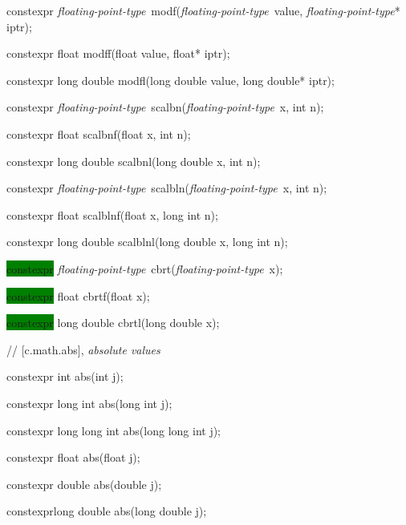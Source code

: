\documentclass[prd,twocolumn,amsmath,amssymb,nofootinbib,eqsecnum]{revtex4-1}
\newcommand{\highlight}[1]{\colorbox{green}{\!\!\!\! #1}}
\newcommand{\oldhighlight}[1]{#1}
\newcommand{\fptype}{{\it floating-point-type}}
\begin{document}
{\vspace{2ex}


\oldhighlight{constexpr} \fptype\ modf(\fptype\ value, \fptype* iptr);

\oldhighlight{constexpr}  float modff(float value, float* iptr);

\oldhighlight{constexpr}  long double modfl(long double value, long double* iptr);

\vspace{2ex}


\oldhighlight{constexpr} \fptype\ scalbn(\fptype\ x, int n);

\oldhighlight{constexpr} float scalbnf(float x, int n);

\oldhighlight{constexpr} long double scalbnl(long double x, int n);

\vspace{2ex}


\oldhighlight{constexpr} \fptype\ scalbln(\fptype\ x, int n);

\oldhighlight{constexpr} float scalblnf(float x, long int n);

\oldhighlight{constexpr} long double scalblnl(long double x, long int n);

\vspace{2ex}

\highlight{constexpr} \fptype\ cbrt(\fptype\ x);

\highlight{constexpr} float cbrtf(float x);

\highlight{constexpr} long double cbrtl(long double x);

\vspace{2ex}

//  [c.math.abs], {\it absolute values}


\oldhighlight{constexpr} int abs(int j);

\oldhighlight{constexpr} long int abs(long int j);

\oldhighlight{constexpr} long long int abs(long long int j);

\oldhighlight{constexpr} float abs(float j);

\oldhighlight{constexpr} double abs(double j);

\oldhighlight{constexpr}long double abs(long double j);

\vspace{2ex}

}
\end{document}
